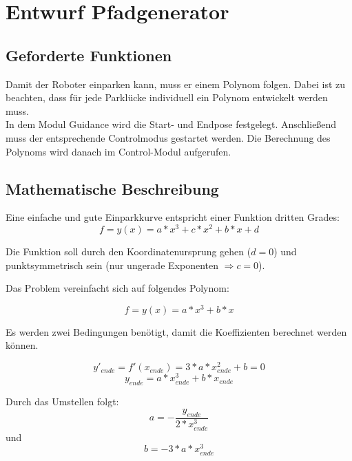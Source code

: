 \chapter{Entwurf Pfadgenerator}

\section{Geforderte Funktionen}

Damit der Roboter einparken kann, muss er einem Polynom folgen. Dabei ist zu beachten, dass für jede Parklücke individuell ein Polynom entwickelt werden muss.\\

\noindent In dem Modul Guidance wird die Start- und Endpose festgelegt. Anschließend muss der entsprechende Controlmodus gestartet werden. Die Berechnung des Polynoms wird danach im Control-Modul aufgerufen. 


\section{Mathematische Beschreibung}

Eine einfache und gute Einparkkurve entspricht einer Funktion dritten Grades:
\begin{equation}
f=y(x)=a*x^3+c*x^2+b*x+d
\end{equation}

\noindent Die Funktion soll durch den Koordinatenursprung gehen ($ d=0 $) und punktsymmetrisch sein (nur ungerade Exponenten $ \Rightarrow c=0 $). 

\noindent Das Problem vereinfacht sich auf folgendes Polynom:

\begin{equation}
f=y(x)=a*x^3+b*x
\end{equation}

\noindent Es werden zwei Bedingungen benötigt, damit die Koeffizienten berechnet werden können. 

\begin{equation}
 y'_{ende}=f'(x_{ende})=3*a*x_{ende}^2+b=0
 \end{equation}
 \begin{equation}
y_{ende}=a*x_{ende}^3+b*x_{ende}
 \end{equation}
 
\noindent Durch das Umstellen folgt:
 \begin{equation}
a=-\dfrac{y_{ende}}{2*x_{ende}^3}
\end{equation}
\noindent und
\begin{equation} 
b=-3*a*x_{ende}^3
\end{equation}

